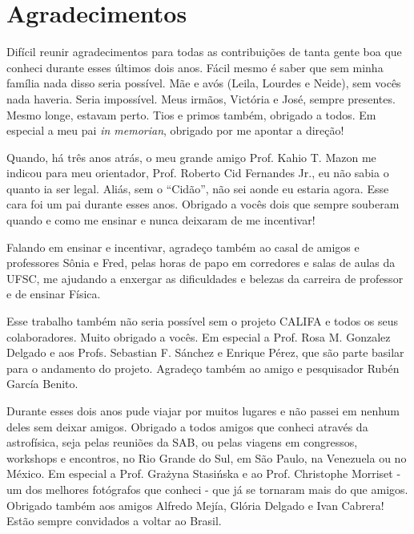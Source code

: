

\chapter*{Agradecimentos}

Difícil reunir agradecimentos para todas as contribuições de tanta gente boa que conheci durante esses últimos dois
anos. Fácil mesmo é saber que sem minha família nada disso seria possível. Mãe e avós (Leila, Lourdes e Neide), sem
vocês nada haveria. Seria impossível. Meus irmãos, Victória e José, sempre presentes. Mesmo longe, estavam perto. Tios e
primos também, obrigado a todos. Em especial a meu pai {\em in memorian}, obrigado por me apontar a direção!

Quando, há três anos atrás, o meu grande amigo Prof. Kahio T. Mazon me indicou para meu orientador, Prof. Roberto Cid
Fernandes Jr., eu não sabia o quanto ia ser legal. Aliás, sem o ``Cidão'', não sei aonde eu estaria agora. Esse cara foi um
pai durante esses anos. Obrigado a vocês dois que sempre souberam quando e como me ensinar e nunca deixaram de me
incentivar!

Falando em ensinar e incentivar, agradeço também ao casal de amigos e professores Sônia e Fred, pelas horas de papo em
corredores e salas de aulas da UFSC, me ajudando a enxergar as dificuldades e belezas da carreira de professor e de
ensinar Física.

Esse trabalho também não seria possível sem o projeto CALIFA e todos os seus colaboradores. Muito obrigado a vocês. Em
especial a Prof. Rosa M. Gonzalez Delgado e aos Profs. Sebastian F. Sánchez e Enrique Pérez, que são parte basilar para
o andamento do projeto. Agradeço também ao amigo e pesquisador Rubén García Benito.

Durante esses dois anos pude viajar por muitos lugares e não passei em nenhum deles sem deixar amigos. Obrigado a todos
amigos que conheci através da astrofísica, seja pelas reuniões da SAB, ou pelas viagens em congressos, workshops e
encontros, no Rio Grande do Sul, em São Paulo, na Venezuela ou no México. Em especial a Prof. Gra\.zyna Stasi\'nska e ao
Prof. Christophe Morriset - um dos melhores fotógrafos que conheci - que já se tornaram mais do que amigos. Obrigado
também aos amigos Alfredo Mejía, Glória Delgado e Ivan Cabrera! Estão sempre convidados a voltar ao Brasil.

